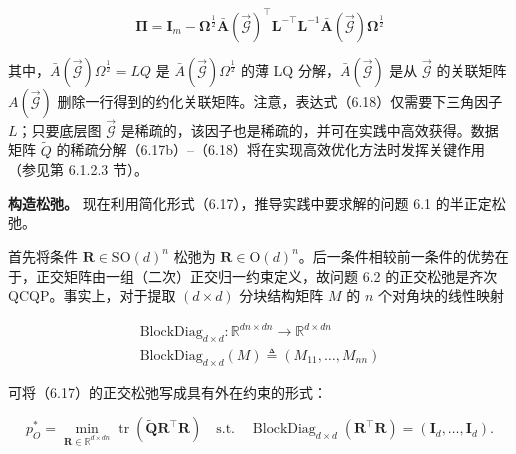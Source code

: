 \begin{equation}
\boldsymbol {\Pi} = \mathbf {I} _ {m} - \boldsymbol {\Omega} ^ {\frac {1}{2}} \bar {\boldsymbol {A}} (\overrightarrow {\mathcal {G}}) ^ {\top} \boldsymbol {L} ^ {- \top} \boldsymbol {L} ^ {- 1} \bar {\boldsymbol {A}} (\overrightarrow {\mathcal {G}}) \boldsymbol {\Omega} ^ {\frac {1}{2}}\tag{6.18}
\end{equation}

其中，$\bar { A } ( \vec { \mathcal { G } } ) \Omega ^ { \frac { 1 } { 2 } } = L Q$ 是 $\bar { A } ( \vec { \mathcal { G } } ) \Omega ^ { \frac { 1 } { 2 } }$ 的薄 LQ 分解，$\bar { A } ( \vec { \mathcal { G } } )$ 是从 $\overrightarrow { \mathcal { G } }$ 的关联矩阵 $A ( { \overrightarrow { \mathcal { G } } } )$ 删除一行得到的约化关联矩阵。注意，表达式（6.18）仅需要下三角因子 $L$；只要底层图 $\vec { \mathcal { G } }$ 是稀疏的，该因子也是稀疏的，并可在实践中高效获得。数据矩阵 $\tilde { Q }$ 的稀疏分解（6.17b）–（6.18）将在实现高效优化方法时发挥关键作用（参见第 6.1.2.3 节）。

\textbf{构造松弛。} 现在利用简化形式（6.17），推导实践中要求解的问题 6.1 的半正定松弛。

首先将条件 $\pmb { R } \in \mathrm { S O } ( d ) ^ { n }$ 松弛为 $\pmb { R } \in \mathrm { O } ( d ) ^ { n }$。后一条件相较前一条件的优势在于，正交矩阵由一组（二次）正交归一约束定义，故问题 6.2 的正交松弛是齐次 QCQP。事实上，对于提取 $( d \times d )$ 分块结构矩阵 $M$ 的 $n$ 个对角块的线性映射

\begin{equation}
\begin{array}{c} \text {BlockDiag} _ {d \times d} \colon \mathbb {R} ^ {d n \times d n} \to \mathbb {R} ^ {d \times d n} \\ \text {BlockDiag} _ {d \times d} (M) \triangleq (M _ {1 1}, \ldots , M _ {n n}) \end{array}\tag{6.19}
\end{equation}

可将（6.17）的正交松弛写成具有外在约束的形式：

\begin{equation}
p _ {O} ^ {*} = \min _ {\boldsymbol {R} \in \mathbb {R} ^ {d \times d n}} \operatorname{tr} \left(\tilde {\boldsymbol {Q}} \boldsymbol {R} ^ {\intercal} \boldsymbol {R}\right) \quad \text {s.t.} \quad \operatorname{BlockDiag} _ {d \times d} (\boldsymbol {R} ^ {\intercal} \boldsymbol {R}) = (\mathbf {I} _ {d}, \dots , \mathbf {I} _ {d}).\tag{6.20}
\end{equation}

